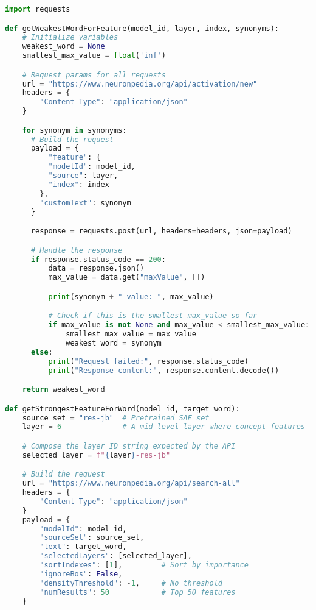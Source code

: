 \documentclass{article}
\begin{document}
\begin{lstlisting}[language=Python, caption={Neuronpedia API Interaction Methods}, label=code:neuronpedia-api, basicstyle=\ttfamily\small, keywordstyle=\color{blue}, commentstyle=\color{gray}]
import requests

def getWeakestWordForFeature(model_id, layer, index, synonyms):
    # Initialize variables
    weakest_word = None
    smallest_max_value = float('inf')

    # Request params for all requests
    url = "https://www.neuronpedia.org/api/activation/new"
    headers = {
        "Content-Type": "application/json"
    }

    for synonym in synonyms:
      # Build the request
      payload = {
          "feature": {
          "modelId": model_id,
          "source": layer,
          "index": index
        },
        "customText": synonym
      }

      response = requests.post(url, headers=headers, json=payload)

      # Handle the response
      if response.status_code == 200:
          data = response.json()
          max_value = data.get("maxValue", [])

          print(synonym + " value: ", max_value)

          # Check if this is the smallest max_value so far
          if max_value is not None and max_value < smallest_max_value:
              smallest_max_value = max_value
              weakest_word = synonym
      else:
          print("Request failed:", response.status_code)
          print("Response content:", response.content.decode())

    return weakest_word

def getStrongestFeatureForWord(model_id, target_word):
    source_set = "res-jb"  # Pretrained SAE set
    layer = 6              # A mid-level layer where concept features tend to emerge

    # Compose the layer ID string expected by the API
    selected_layer = f"{layer}-res-jb"

    # Build the request
    url = "https://www.neuronpedia.org/api/search-all"
    headers = {
        "Content-Type": "application/json"
    }
    payload = {
        "modelId": model_id,
        "sourceSet": source_set,
        "text": target_word,
        "selectedLayers": [selected_layer],
        "sortIndexes": [1],         # Sort by importance
        "ignoreBos": False,
        "densityThreshold": -1,     # No threshold
        "numResults": 50            # Top 50 features
    }


\end{lstlisting}
\end{document}
